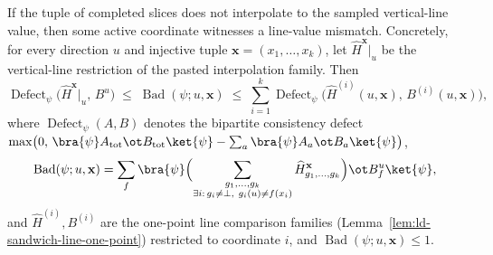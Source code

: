 \begin{lemma}\label{lem:line-interpolation-mismatch-estimates}
	\leanok
	If the tuple of completed slices does not interpolate to the sampled
	vertical-line value, then some active coordinate witnesses a line-value
	mismatch. Concretely, for every direction $u$ and injective tuple
	$\mathbf{x}=(x_1,\dots,x_k)$, let $\widehat{H}^{\mathbf{x}}\rvert_u$ be the
	vertical-line restriction of the pasted interpolation family. Then
	\[
		\operatorname{Defect}_\psi\bigl(
			\widehat{H}^{\mathbf{x}}\rvert_u,\,
			B^u\bigr)
		\;\le\;
		\operatorname{Bad}(\psi;u,\mathbf{x})
		\;\le\;
		\sum_{i=1}^k
		\operatorname{Defect}_\psi\bigl(
			\widehat{H}^{(i)}(u,\mathbf{x}),\,
			B^{(i)}(u,\mathbf{x})\bigr),
	\]
	where $\operatorname{Defect}_\psi(A,B)$ denotes the bipartite consistency
	defect $\max\bigl(0,\,
		\bra{\psi} A_{\mathrm{tot}}\ot B_{\mathrm{tot}}\ket{\psi}
		- \sum_a \bra{\psi} A_a\ot B_a\ket{\psi}\bigr)$,
		\[
			\operatorname{Bad}(\psi;u,\mathbf{x})
			= \sum_f \bra{\psi}
			\Bigl(\sum_{\substack{g_1,\dots,g_k\\ \exists i:\, g_i\ne\bot,\ g_i(u)\ne f(x_i)}}
				\widehat H_{g_1,\dots,g_k}^{\mathbf{x}}
			\Bigr) \ot B_f^u
			\ket{\psi},
		\]
		and $\widehat{H}^{(i)},B^{(i)}$ are the one-point line comparison
		families (Lemma~\ref{lem:ld-sandwich-line-one-point})
		restricted to coordinate $i$, and $\operatorname{Bad}(\psi;u,\mathbf{x})\le 1$.
\end{lemma}
